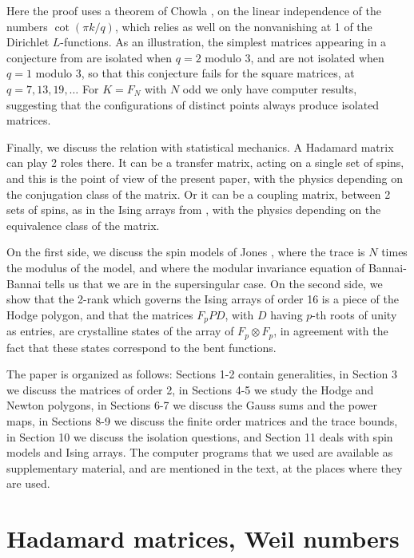 \documentclass[11pt]{amsart}
\theoremstyle{definition}
\begin{document}
Here the proof uses a theorem of Chowla \cite{cho}, on the linear independence of the numbers $\cot(\pi k/q)$, which relies as well on the nonvanishing at 1 of the Dirichlet $L$-functions. As an illustration, the simplest matrices appearing in a conjecture from \cite{bop} are isolated when $q=2$ modulo 3, and are not isolated when $q=1$ modulo 3, so that this conjecture fails for the square matrices, at $q=7,13,19,\ldots$ For $K=F_N$ with $N$ odd we only have computer results, suggesting that the configurations of distinct points always produce isolated matrices.

\medskip

Finally, we discuss the relation with statistical mechanics. A Hadamard matrix can play 2 roles there. It can be a transfer matrix, acting on a single set of spins, and this is the point of view of the present paper, with the physics depending on the conjugation class of the matrix. Or it can be a coupling matrix, between 2 sets of spins, as in the Ising arrays from \cite{obo}, with the physics depending on the equivalence class of the matrix.

\medskip

On the first side, we discuss the spin models of Jones \cite{jon}, where the trace is $N$ times the modulus of the model, and where the modular invariance equation of Bannai-Bannai \cite{bb1} tells us that we are in the supersingular case. On the second side, we show that the 2-rank which governs the Ising arrays of order 16 is a piece of the Hodge polygon, and that the matrices $F_pPD$, with $D$ having $p$-th roots of unity as entries, are crystalline states of the array of $F_p\otimes F_p$, in agreement with the fact that these states correspond to the bent functions.

\medskip

The paper is organized as follows: Sections 1-2 contain generalities, in Section 3 we discuss the matrices of order 2, in Sections 4-5 we study the Hodge and Newton polygons, in Sections 6-7 we discuss the Gauss sums and the power maps, in Sections 8-9 we discuss the finite order matrices and the trace bounds, in Section 10 we discuss the isolation questions, and Section 11 deals with spin models and Ising arrays. The computer programs that we used are available as supplementary material, and are mentioned in the text, at the places where they are used.

\section{Hadamard matrices, Weil numbers}
\end{document}
